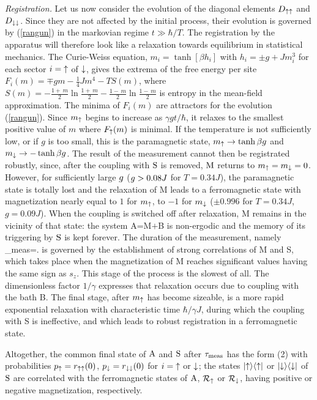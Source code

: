 \begin{multicols}{2}
{\it Registration.}
Let us now consider the evolution of the diagonal elements
$D_{{\uparrow}{\uparrow}}$ and $D_{{\downarrow}{\downarrow}}$. Since they are not affected by the
initial process, their evolution is governed by (\ref{rangun}) in the 
markovian regime $t\gg \hbar/T$. The registration by the apparatus will 
therefore look like a relaxation towards equilibrium in statistical mechanics. 
The Curie-Weiss  equation, $m_{i}=\tanh[\beta h_{i}]$ with
$h_i=\pm g+Jm^{3}_{i}$ for each sector $i={\uparrow}$ of ${\downarrow}$,
 gives the extrema of the free energy per site
$F_i(m)=\mp gm-\frac{1}{4}Jm^4-TS(m)$, where 
$S(m)=-\frac{1+\,m}{2}\ln\frac{1+\,m}{2}-\frac{1-\,m}{2}\ln\frac{1-\,m}{2}$ 
is entropy in the mean-field approximation.
The minima of $F_i(m)$ are attractors for the evolution 
(\ref{rangun}). Since $m_{\uparrow}$ begins to 
increase as $\gamma gt/\hbar$, it relaxes to the smallest positive value
of $m$ where $F_{\uparrow}(m)$ is minimal. If the temperature is 
not sufficiently low, or
if $g$ is too small, this is the paramagnetic state, $m_{\uparrow}\to\tanh\beta g$ 
and $m_{\downarrow}\to-\tanh\beta g$. The result of the measurement cannot then
be registrated robustly, since, after the coupling with ${\rm S}$ is removed,
${\rm M}$ returns to $m_{\uparrow}=m_{\downarrow}=0$. 
However, for sufficiently large ${g}$ (${g}>0.08 J$ for $T=0.34J$), 
the paramagnetic state is totally lost
and the relaxation of M leads to a ferromagnetic state with 
magnetization nearly equal to $1$ for $m_{\uparrow}$, to $-1$ for $m_{\downarrow}$
($\pm 0.996$ for $T=0.34 J$, $g=0.09 J$).
When the coupling is switched off after relaxation, 
M remains in the vicinity of that state:
the system A=M$+$B is non-ergodic and the memory of its 
triggering by ${\rm S}$ is kept forever.
The duration of the measurement, namely
\BEQ 
\label{taumeas} \tau_{\rm meas}=\frac{\hbar}{\gamma \g}. 
\EEQ
is governed by the establishment of strong correlations of M and S, which
takes place when the magnetization of M 
reaches significant values having the same 
sign as $s_z$. This stage of the process is the slowest of all.
The dimensionless factor $1/\gamma$ expresses that relaxation 
occurs due to coupling with the bath B.
The final stage, after $m_{\uparrow}$ has become sizeable, is a more 
rapid exponential relaxation with characteristic time $\hbar/\gamma J$, 
 during which the coupling with S is ineffective, and 
which leads to robust registration in a ferromagnetic state.

Altogether, 
the common final state of ${\rm A}$ and ${\rm S}$ after $\tau_{\rm meas}$
has the form (2) with probabilities
$p_{\uparrow}=r_{{\uparrow}{\uparrow}}(0)$, $p_{\downarrow}=r_{{\downarrow}{\downarrow}}(0)$ 
for $i={\uparrow}$ or ${\downarrow}$; the
states $|{\uparrow}\rangle\langle{\uparrow}|$ or
$|{\downarrow}\rangle\langle{\downarrow}|$
of ${\rm S}$ are correlated with the ferromagnetic states of ${\rm A}$, 
${\cal R}_{\uparrow}$ or ${\cal R}_{\downarrow}$, having positive or negative magnetization,
respectively.


\end{multicols}
